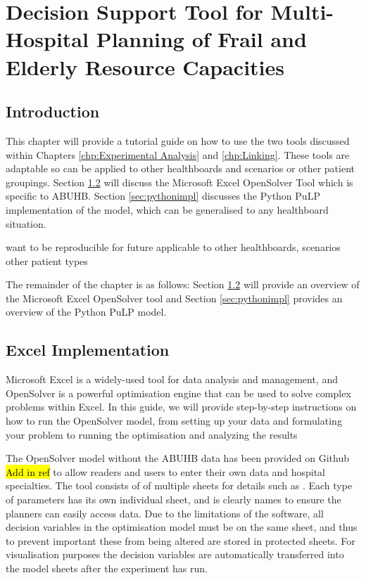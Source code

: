 \documentclass[../thesis.tex]{subfiles}
\begin{document}
\chapter{Decision Support Tool for Multi-Hospital Planning of Frail and Elderly Resource Capacities}\label{chp:tool}

\section{Introduction}
This chapter will provide a tutorial guide on how to use the two tools discussed within Chapters \ref{chp:Experimental Analysis} and \ref{chp:Linking}. These tools are adaptable so can be applied to other healthboards and scenarios or other patient groupings. Section \ref{sec:excelimp} will discuss the Microsoft Excel OpenSolver Tool which is specific to ABUHB. Section \ref{sec:pythonimpl} discusses the Python PuLP implementation of the model, which can be generalised to any healthboard situation.



want to be reproducible for future
applicable to other healthboards, scenarios
other patient types

The remainder of the chapter is as follows: Section \ref{sec:excelimp} will provide an overview of the Microsoft Excel OpenSolver tool and Section \ref{sec:pythonimpl} provides an overview of the Python PuLP model.


\section{Excel Implementation}\label{sec:excelimp}
Microsoft Excel is a widely-used tool for data analysis and management, and OpenSolver is a powerful optimisation engine that can be used to solve complex problems within Excel. In this guide, we will provide step-by-step instructions on how to run the OpenSolver model, from setting up your data and formulating your problem to running the optimisation and analyzing the results

The OpenSolver model without the ABUHB data has been provided on Github \cite{}\hl{Add in ref} to allow readers and users to enter their own data and hospital specialties. The tool consists of of multiple sheets for details such as . Each type of parameters has its own individual sheet, and is clearly names to ensure the planners can easily access data. Due to the limitations of the software, all decision variables in the optimisation model must be on the same sheet, and thus to prevent important these from being altered are stored in protected sheets. For visualisation purposes the decision variables are automatically transferred into the model sheets after the experiment has run.
\end{document}
